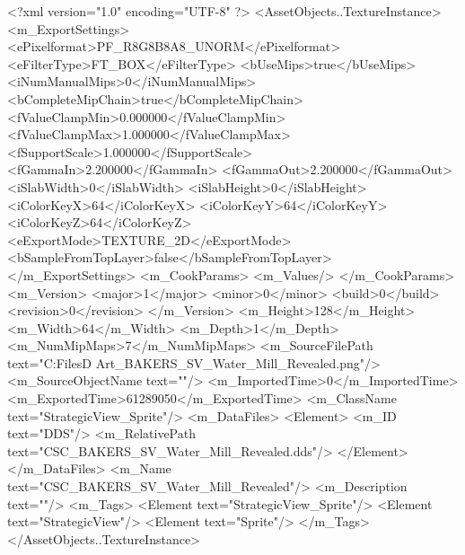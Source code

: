 <?xml version="1.0" encoding="UTF-8" ?>
<AssetObjects..TextureInstance>
	<m_ExportSettings>
		<ePixelformat>PF_R8G8B8A8_UNORM</ePixelformat>
		<eFilterType>FT_BOX</eFilterType>
		<bUseMips>true</bUseMips>
		<iNumManualMips>0</iNumManualMips>
		<bCompleteMipChain>true</bCompleteMipChain>
		<fValueClampMin>0.000000</fValueClampMin>
		<fValueClampMax>1.000000</fValueClampMax>
		<fSupportScale>1.000000</fSupportScale>
		<fGammaIn>2.200000</fGammaIn>
		<fGammaOut>2.200000</fGammaOut>
		<iSlabWidth>0</iSlabWidth>
		<iSlabHeight>0</iSlabHeight>
		<iColorKeyX>64</iColorKeyX>
		<iColorKeyY>64</iColorKeyY>
		<iColorKeyZ>64</iColorKeyZ>
		<eExportMode>TEXTURE_2D</eExportMode>
		<bSampleFromTopLayer>false</bSampleFromTopLayer>
	</m_ExportSettings>
	<m_CookParams>
		<m_Values/>
	</m_CookParams>
	<m_Version>
		<major>1</major>
		<minor>0</minor>
		<build>0</build>
		<revision>0</revision>
	</m_Version>
	<m_Height>128</m_Height>
	<m_Width>64</m_Width>
	<m_Depth>1</m_Depth>
	<m_NumMipMaps>7</m_NumMipMaps>
	<m_SourceFilePath text="C:\Users\Shadow\Desktop\Working Files\2D Art\Quarters\Bakers\StrategicView\CSC_BAKERS_SV_Water_Mill_Revealed.png"/>
	<m_SourceObjectName text=""/>
	<m_ImportedTime>0</m_ImportedTime>
	<m_ExportedTime>61289050</m_ExportedTime>
	<m_ClassName text="StrategicView_Sprite"/>
	<m_DataFiles>
		<Element>
			<m_ID text="DDS"/>
			<m_RelativePath text="CSC_BAKERS_SV_Water_Mill_Revealed.dds"/>
		</Element>
	</m_DataFiles>
	<m_Name text="CSC_BAKERS_SV_Water_Mill_Revealed"/>
	<m_Description text=""/>
	<m_Tags>
		<Element text="StrategicView_Sprite"/>
		<Element text="StrategicView"/>
		<Element text="Sprite"/>
	</m_Tags>
</AssetObjects..TextureInstance>

